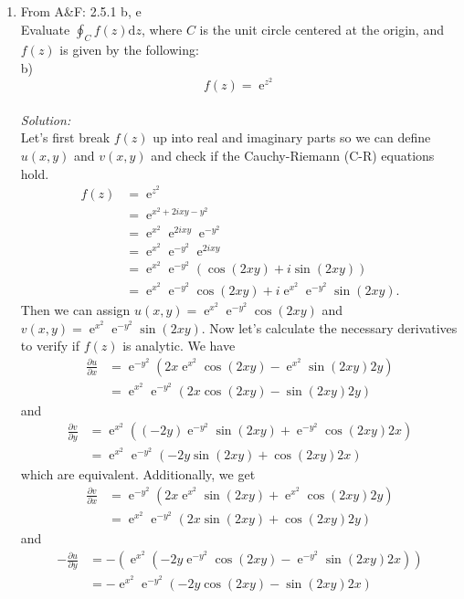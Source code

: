 \documentclass[10pt]{amsart}
\newcommand{\D}{\mathrm{d}}
\DeclareMathOperator{\E}{e}
\theoremstyle{nonumberplain}
\begin{document}
\begin{enumerate}[label={\bf {\arabic*}:}]
\item From A\&F: 2.5.1 b, e \\
Evaluate $\oint_C f(z)\D z$, where $C$ is the unit circle centered at the origin, and $f(z)$ is given by the following: \\
b) $$f(z) = \E^{z^2}$$ \\
\textit{Solution:} \\
Let's first break $f(z)$ up into real and imaginary parts so we can define $u(x, y)$ and $v(x, y)$ and check if the Cauchy-Riemann (C-R) equations hold.
\begin{align*}
f(z) &= \E^{z^2} \\
	&= \E^{ x^2 + 2ixy - y^2} \\
	&= \E^{x^2}\E^{2ixy}\E^{- y^2} \\
	&= \E^{x^2}\E^{- y^2}\E^{2ixy} \\
	&= \E^{x^2}\E^{- y^2}\left( \cos (2xy) + i \sin (2xy)\right) \\
	&= \E^{x^2}\E^{- y^2}\cos (2xy) + i \E^{x^2}\E^{- y^2}\sin (2xy).
\end{align*}
Then we can assign $u(x, y) = \E^{x^2}\E^{- y^2}\cos (2xy)$ and $v(x, y) = \E^{x^2}\E^{- y^2}\sin (2xy)$.
Now let's calculate the necessary derivatives to verify if $f(z)$ is analytic.
We have
\begin{align*}
\frac {\partial u}{\partial x} &= \E^{-y^2}\left( 2x\E^{x^2}\cos (2xy) - \E^{x^2} \sin (2xy)2y\right) \\
	&= \E^{x^2}\E^{-y^2}\left( 2x\cos (2xy) - \sin (2xy)2y\right)
\end{align*}
and
\begin{align*}
\frac {\partial v}{\partial y} &= \E^{x^2}\left( (-2y)\E^{-y^2}\sin(2xy) + \E^{-y^2}\cos (2xy)2x\right) \\
	&= \E^{x^2}\E^{-y^2}\left( -2y\sin(2xy) + \cos (2xy)2x\right)
\end{align*}
which are equivalent.
Additionally, we get
\begin{align*}
\frac {\partial v}{\partial x} &= \E^{- y^2} \left( 2x\E^{x^2}\sin (2xy) + \E^{x^2}\cos (2xy)2y \right) \\
	&= \E^{x^2}\E^{- y^2} \left( 2x\sin (2xy) + \cos (2xy)2y \right)
\end{align*}
and
\begin{align*}
- \frac {\partial u}{\partial y} &= -\left( \E^{x^2} \left( -2y\E^{- y^2}\cos (2xy) - \E^{- y^2}\sin (2xy)2x \right) \right) \\
	&= - \E^{x^2} \E^{- y^2} \left( -2y\cos (2xy) - \sin (2xy)2x \right) \\

\end{align*}
\end{enumerate}
\end{document}
